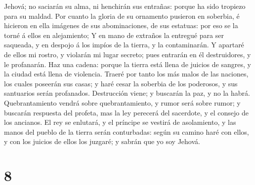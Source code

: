 Jehová; no saciarán su alma, ni henchirán sus entrañas: porque ha sido
tropiezo para su maldad.  Por cuanto la gloria de su
ornamento pusieron en soberbia, é hicieron en ella imágenes de sus
abominaciones, de sus estatuas: por eso se la torné á ellos en
alejamiento;  Y en mano de extraños la entregué para ser
saqueada, y en despojo á los impíos de la tierra, y la contaminarán.
 Y apartaré de ellos mi rostro, y violarán mi lugar
secreto; pues entrarán en él destruidores, y le profanarán.
 Haz una cadena: porque la tierra está llena de juicios de
sangres, y la ciudad está llena de violencia.  Traeré por
tanto los más malos de las naciones, los cuales poseerán sus casas; y
haré cesar la soberbia de los poderosos, y sus santuarios serán
profanados.  Destrucción viene; y buscarán la paz, y no la
habrá.  Quebrantamiento vendrá sobre quebrantamiento, y
rumor será sobre rumor; y buscarán respuesta del profeta, mas la ley
perecerá del sacerdote, y el consejo de los ancianos.  El
rey se enlutará, y el príncipe se vestirá de asolamiento, y las manos
del pueblo de la tierra serán conturbadas: según su camino haré con
ellos, y con los juicios de ellos los juzgaré; y sabrán que yo soy
Jehová.

\hypertarget{section-7}{%
\section{8}\label{section-7}}

